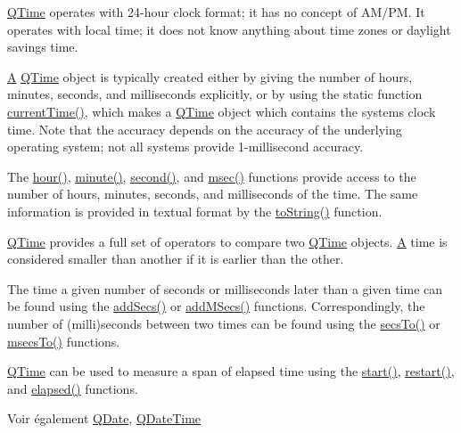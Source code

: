 \hyperlink{class_q_time}{Q\+Time} operates with 24-\/hour clock format; it has no concept of A\+M/\+P\+M. It operates with local time; it does not know anything about time zones or daylight savings time.

\hyperlink{class_a}{A} \hyperlink{class_q_time}{Q\+Time} object is typically created either by giving the number of hours, minutes, seconds, and milliseconds explicitly, or by using the static function \hyperlink{class_q_time_a39b156ef7067e581f9fd70de6ef9ea4d}{current\+Time()}, which makes a \hyperlink{class_q_time}{Q\+Time} object which contains the system\textquotesingle{}s clock time. Note that the accuracy depends on the accuracy of the underlying operating system; not all systems provide 1-\/millisecond accuracy.

The \hyperlink{class_q_time_ab08f1d63181f7682b5d585329b20f6a0}{hour()}, \hyperlink{class_q_time_a77a8a0a830be56dac73bf51fe0eb724d}{minute()}, \hyperlink{class_q_time_a6602081b659eb25b34d2df25df162510}{second()}, and \hyperlink{class_q_time_ae6a7425b7a638ec534304bf0a01f41dc}{msec()} functions provide access to the number of hours, minutes, seconds, and milliseconds of the time. The same information is provided in textual format by the \hyperlink{class_q_time_a4cbd70ad4fa6b17fd10c5ae0f23784b2}{to\+String()} function.

\hyperlink{class_q_time}{Q\+Time} provides a full set of operators to compare two \hyperlink{class_q_time}{Q\+Time} objects. \hyperlink{class_a}{A} time is considered smaller than another if it is earlier than the other.

The time a given number of seconds or milliseconds later than a given time can be found using the \hyperlink{class_q_time_ab5a97cb2e948c6e16db530d9bbb7a58f}{add\+Secs()} or \hyperlink{class_q_time_aa0a59e4c2177efe6aa5b789899efc199}{add\+M\+Secs()} functions. Correspondingly, the number of (milli)seconds between two times can be found using the \hyperlink{class_q_time_ae83eafdf47fac8a47dd62ccf5a9c43b4}{secs\+To()} or \hyperlink{class_q_time_a899f6a5ccad59578249c7717ce5dfcb5}{msecs\+To()} functions.

\hyperlink{class_q_time}{Q\+Time} can be used to measure a span of elapsed time using the \hyperlink{class_q_time_aafacb3c8da8d383b7e688f6df20c8835}{start()}, \hyperlink{class_q_time_ae4031d9d548cfa663c03d64ac6eb32f6}{restart()}, and \hyperlink{class_q_time_ae6223ec2c678edc4c0b4e8b4d51091c8}{elapsed()} functions.

\begin{DoxySeeAlso}{Voir également}
\hyperlink{class_q_date}{Q\+Date}, \hyperlink{class_q_date_time}{Q\+Date\+Time} 
\end{DoxySeeAlso}


